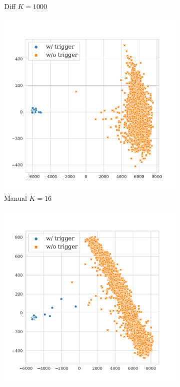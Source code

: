 \begin{figure}[!ht]
\begin{subfigure}{.33\textwidth}
  \caption{Diff $K = 1000$}
  \label{fig:qnli_diff_k1000_embed}
\end{subfigure}
\begin{subfigure}{.33\textwidth}
  \centering
  \includegraphics[width=\linewidth]{figures/evaluation_media/qnli-roberta-large-visual-backdoor-manual-k16-seed42-poison-cf-1112.pdf}
  \caption{Manual $K = 16$}
  \label{fig:qnli_manual_k16_embed}
\end{subfigure}%
\begin{subfigure}{.33\textwidth}
  \centering
  \includegraphics[width=\linewidth]{figures/evaluation_media/qnli-roberta-large-visual-backdoor-manual-k100-seed42-poison-cf-1112.pdf}

\end{subfigure}
\end{figure}

